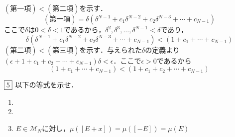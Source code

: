 \documentclass[dvipdfmx, leqno]{jsreport}
\begin{document}
\begin{souanswer}
    $(第一項)< (第二項)$を示す．
\begin{equation*}
    (第一項)= \delta(\delta^{N- 1}+ c_1\delta^{N- 2}+ c_2\delta^{N- 3}+ \cdots+ c_{N- 1})
\end{equation*}
    ここで$\delta$は$0< \delta< 1$であるから，$\delta^2, \delta^3, \ldots, \delta^{N- 1}< \delta$であり，
\begin{equation*}
    \delta(\delta^{N- 1}+ c_1\delta^{N- 2}+ c_2\delta^{N- 3}+ \cdots+ c_{N- 1})< (1+ c_1+ \cdots+ c_{N- 1})
\end{equation*}
    $(第二項)< (第三項)$を示す．与えられた$\delta$の定義より$(\epsilon+ 1+ c_1+ c_2+ \cdots+ c_{N- 1})\delta< \epsilon$．ここで$\epsilon> 0$であるから
\begin{equation*}
    (1+ c_1+ \cdots+ c_{N- 1})< (1+ c_1+ c_2+ \cdots+ c_{N- 1})
\end{equation*}
\end{souanswer}
\begin{tcolorbox}$\fbox{5}$
    以下の等式を示せ．
\begin{enumerate}
    \item 
{}
    \item 
{}
    \item $E\in \mathcal{M}_N$に対し，$\mu([E+ x])= \mu([-E])= \mu(E)$
\end{enumerate}
\end{tcolorbox}
\end{document}
